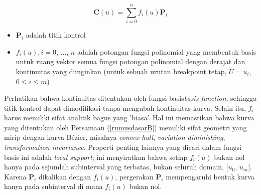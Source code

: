 \begin{equation}
	\textbf{C}(u) = \sum_{i = 0}^{n} f_{i}(u) \textbf{P}_i
	\label{rumusdasarB}
\end{equation}
\begin{itemize}
	\item $\textbf{P}_i$ adalah titik kontrol
	\item {$f_{i}(u), i = 0$, ..., $n$} adalah 
	potongan fungsi polinomial yang membentuk 
	basis untuk ruang vektor semua fungsi potongan 
	polinomial dengan derajat dan kontinuitas yang 
	diinginkan (untuk sebuah urutan breakpoint tetap, 
	$U = {u_i}$, $0 \leq i \leq m$)
\end{itemize}
Perhatikan bahwa kontinuitas ditentukan oleh 
fungsi basis\textit{basis function}, sehingga 
titik kontrol dapat dimodifikasi tanpa mengubah 
kontinuitas kurva. Selain itu, {$f_i$} harus memiliki 
sifat analitik bagus yang 'biasa'. Hal ini 
memastikan bahwa kurva yang ditentukan oleh 
Persamaan (\ref{rumusdasarB}) memiliki sifat 
geometri yang mirip dengan kurva Bézier, misalnya 
\textit{convex hull}, \textit{variation diminishing}, 
\textit{transformation invariance}. Properti penting 
lainnya yang dicari dalam fungsi basis ini adalah \textit{local support}; 
ini menyiratkan bahwa setiap $f_{i}(u)$ bukan nol 
hanya pada sejumlah subinterval yang terbatas, 
bukan seluruh domain, [$u_0$, $u_m$]. Karena $\textbf{P}_i$ 
dikalikan dengan $f_{i}(u)$, pergerakan $\textbf{P}_i$ 
mempengaruhi bentuk kurva hanya pada subinterval 
di mana $f_{i}(u)$ bukan nol.

